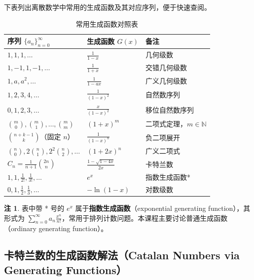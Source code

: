 \documentclass[UTF8,11pt,a4paper]{ctexbook}   %
\theoremstyle{definition}
\newtheorem{remark}{注}[section]
\begin{document}
下表列出离散数学中常用的生成函数及其对应序列，便于快速查阅。

\begin{table}[htbp]
\centering
\caption{常用生成函数对照表}\label{tab:common-gf}
\begin{tabular}{|l|l|l|}
\hline
\textbf{序列 $\{a_n\}_{n=0}^{\infty}$} & \textbf{生成函数 $G(x)$} & \textbf{备注} \\
\hline
$1,1,1,\dots$ & $\displaystyle\frac{1}{1-x}$ & 几何级数 \\
\hline
$1,-1,1,-1,\dots$ & $\displaystyle\frac{1}{1+x}$ & 交错几何级数 \\
\hline
$1,a,a^2,\dots$ & $\displaystyle\frac{1}{1-ax}$ & 广义几何级数 \\
\hline
$1,2,3,4,\dots$ & $\displaystyle\frac{1}{(1-x)^2}$ & 自然数序列 \\
\hline
$0,1,2,3,\dots$ & $\displaystyle\frac{x}{(1-x)^2}$ & 移位自然数序列 \\
\hline
$\binom{m}{0},\binom{m}{1},\dots,\binom{m}{m}$ & $(1+x)^m$ & 二项式定理，$m\in\mathbb{N}$ \\
\hline
$\binom{n+k-1}{k}$（固定 $n$） & $\displaystyle\frac{1}{(1-x)^n}$ & 负二项展开 \\
\hline
$\binom{n}{0},2\binom{n}{1},2^2\binom{n}{2},\dots$ & $(1+2x)^n$ & 广义二项式 \\
\hline
$C_n=\frac{1}{n+1}\binom{2n}{n}$ & $\displaystyle\frac{1-\sqrt{1-4x}}{2x}$ & 卡特兰数 \\
\hline
$1,1,\frac{1}{2!},\frac{1}{3!},\dots$ & $e^x$ & 指数生成函数* \\
\hline
$0,1,\frac{1}{2},\frac{1}{3},\dots$ & $-\ln(1-x)$ & 对数级数 \\
\hline
\end{tabular}
\end{table}

\begin{remark}
表中带 * 号的 $e^x$ 属于\textbf{指数生成函数}（exponential generating function），其形式为 $\displaystyle\sum_{n=0}^{\infty}a_n\frac{x^n}{n!}$，常用于排列计数问题。本课程主要讨论普通生成函数（ordinary generating function）。
\end{remark}

\subsection{卡特兰数的生成函数解法（Catalan Numbers via Generating Functions）}
\end{document}

